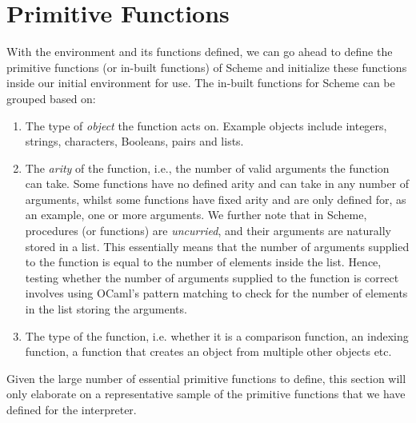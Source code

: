 \section{Primitive Functions}
With the environment and its functions defined, we can go ahead to define the primitive functions (or in-built functions) of Scheme and initialize these functions inside our initial environment for use. 
The in-built functions for Scheme can be grouped based on:
\begin{enumerate}
   \item The type of \textit{object} the function acts on. Example objects include integers, strings, characters, Booleans, pairs and lists.
   \item The \textit{arity} of the function, i.e., the number of valid arguments the function can take. Some functions have no defined arity and can take in any number of arguments, whilst some functions have fixed arity and are only 
   defined for, as an example, one or more arguments. We further note that in Scheme, procedures (or functions) are \textit{uncurried}, and their arguments are naturally stored in a list. This essentially means that the number of 
   arguments supplied to the function is equal to the number of elements inside the list. Hence, testing whether the number of arguments supplied to the function is correct involves using OCaml’s pattern matching to check 
   for the number of elements in the list storing the arguments.
   \item The type of the function, i.e. whether it is a comparison function, an indexing function, a function that creates an object from multiple other objects etc.
\end{enumerate}
Given the large number of essential primitive functions to define, this section will only elaborate on a representative sample of the primitive functions that we have defined for the interpreter. 
